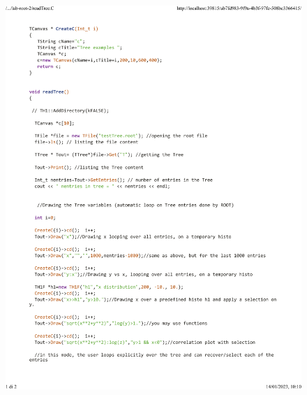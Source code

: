 \documentclass[10pt,a4paper]{article}
\begin{document}
\begin{figure}[h!]
	\centering
	\includegraphics[width=1.\linewidth]{_..._lab-root-2_readTree.C}
	\caption{}
	\label{fig:2}
\end{figure}
\end{document}
